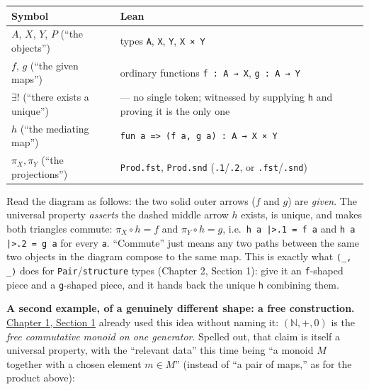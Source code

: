 \begin{center}

\end{center}

{\small\begin{tabular}{
  >{\raggedright\arraybackslash}p{}
  >{\raggedright\arraybackslash}p{}
}
\toprule
Symbol & Lean \\
\midrule
\(A\), \(X\), \(Y\), \(P\) (``the objects'') & types \texttt{A}, \texttt{X}, \texttt{Y}, \texttt{X × Y} \\
\(f\), \(g\) (``the given maps'') & ordinary functions \texttt{f : A → X}, \texttt{g : A → Y} \\
\(\exists!\) (``there exists a unique'') & --- no single token; witnessed by supplying \texttt{h} and proving it is the only one \\
\(h\) (``the mediating map'') & \texttt{fun a => (f a, g a) : A → X × Y} \\
\(\pi_X, \pi_Y\) (``the projections'') & \texttt{Prod.fst}, \texttt{Prod.snd} (\texttt{.1}/\texttt{.2}, or \texttt{.fst}/\texttt{.snd}) \\
\bottomrule
\end{tabular}}


Read the diagram as follows: the two solid outer arrows (\(f\) and \(g\)) are \emph{given}. The universal property \emph{asserts} the dashed middle arrow \(h\) exists, is unique, and makes both triangles commute: \(\pi_X \circ h = f\) and \(\pi_Y \circ h = g\), i.e.~\texttt{h a |>.1 = f a} and \texttt{h a |>.2 = g a} for every \texttt{a}. ``Commute'' just means any two paths between the same two objects in the diagram compose to the same map. This is exactly what \texttt{⟨\_\allowbreak{}, \_\allowbreak{}⟩} does for \texttt{Pair}/\texttt{structure} types (Chapter 2, Section 1): give it an \texttt{f}-shaped piece and a \texttt{g}-shaped piece, and it hands back the unique \texttt{h} combining them.

\textbf{A second example, of a genuinely different shape: a free construction.} \hyperref[sec:01-basics:01-everything-has-a-type:1]{Chapter 1, Section 1} already used this idea without naming it: \((\mathbb{N}, +, 0)\) is the \emph{free commutative monoid on one generator}. Spelled out, that claim is itself a universal property, with the ``relevant data'' this time being ``a monoid \(M\) together with a chosen element \(m \in M\)'' (instead of ``a pair of maps,'' as for the product above):

